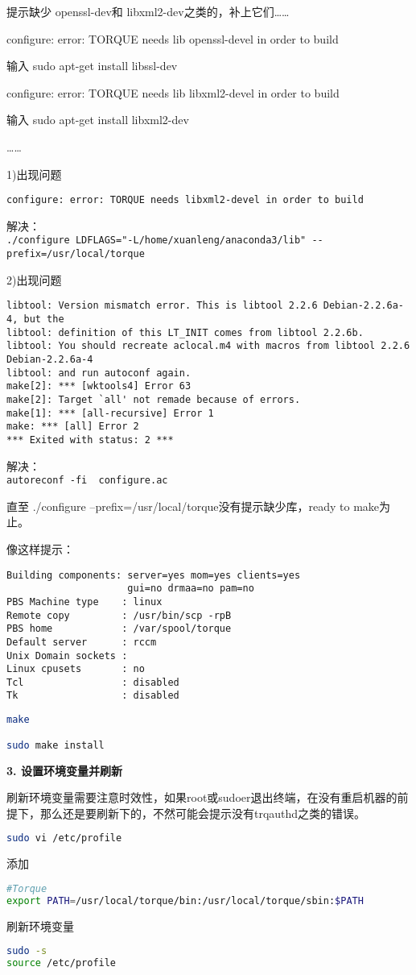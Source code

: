 {提示缺少 openssl-dev和 libxml2-dev之类的，补上它们……

configure: error: TORQUE needs lib openssl-devel in order to build

输入 sudo apt-get install libssl-dev

configure: error: TORQUE needs lib libxml2-devel in order to build

输入 sudo apt-get install libxml2-dev

……

1)出现问题
\begin{verbatim}
configure: error: TORQUE needs libxml2-devel in order to build
\end{verbatim}

解决：\\
\verb|./configure LDFLAGS="-L/home/xuanleng/anaconda3/lib" --prefix=/usr/local/torque|

2)出现问题
\begin{verbatim}
libtool: Version mismatch error. This is libtool 2.2.6 Debian-2.2.6a-4, but the
libtool: definition of this LT_INIT comes from libtool 2.2.6b.
libtool: You should recreate aclocal.m4 with macros from libtool 2.2.6 Debian-2.2.6a-4
libtool: and run autoconf again.
make[2]: *** [wktools4] Error 63
make[2]: Target `all' not remade because of errors.
make[1]: *** [all-recursive] Error 1
make: *** [all] Error 2
*** Exited with status: 2 ***
\end{verbatim}
解决：\\
\verb|autoreconf -fi  configure.ac |



直至 ./configure --prefix=/usr/local/torque没有提示缺少库，ready to make为止。

像这样提示：
\begin{verbatim}
Building components: server=yes mom=yes clients=yes
                     gui=no drmaa=no pam=no
PBS Machine type    : linux
Remote copy         : /usr/bin/scp -rpB
PBS home            : /var/spool/torque
Default server      : rccm
Unix Domain sockets :
Linux cpusets       : no
Tcl                 : disabled
Tk                  : disabled
\end{verbatim}

\begin{lstlisting}[language=sh]
make

sudo make install
\end{lstlisting}

\textbf{3. 设置环境变量并刷新}

刷新环境变量需要注意时效性，如果root或sudoer退出终端，在没有重启机器的前提下，那么还是要刷新下的，不然可能会提示没有trqauthd之类的错误。
\begin{lstlisting}[language=sh]
sudo vi /etc/profile
\end{lstlisting}
添加
\begin{lstlisting}[language=sh]
#Torque
export PATH=/usr/local/torque/bin:/usr/local/torque/sbin:$PATH
\end{lstlisting}
刷新环境变量
\begin{lstlisting}[language=sh]
sudo -s
source /etc/profile
\end{lstlisting}

}
